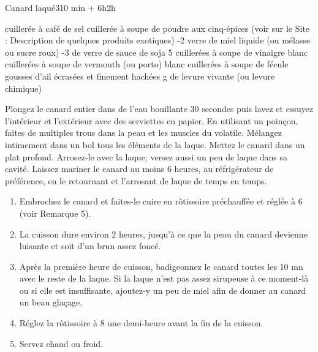 \begin{recette}{Canard laqué}{3}{10 min + 6h}{2h}

\begin{ingredients}
 cuillerée à café de sel
 cuillerée à soupe de poudre aux cinq-épices (voir sur le Site : Description de quelques produits exotiques)
-2 verre de miel liquide (ou mélasse ou sucre roux)
-3 de verre de sauce de soja 5 cuillerées à soupe de vinaigre blanc
 cuillerées à soupe de vermouth (ou porto) blanc
 cuillerées à soupe de fécule
 gousses d'ail écrasées et finement hachées
 g de levure vivante (ou levure chimique)
\end{ingredients}

\begin{preparation}
\etape Plongez le canard entier dans de l'eau bouillante 30 secondes puis lavez et essuyez l'intérieur et l'extérieur avec des serviettes en papier.
\etape En utilisant un poinçon, faites de multiples trous dans la peau et les muscles du volatile.
\etape Mélangez intimement dans un bol tous les éléments de la laque.
\etape Mettez le canard dans un plat profond. Arrosez-le avec la laque; versez aussi un peu de laque dans sa cavité.
\etape Laissez mariner le canard au moins 6 heures, au réfrigérateur de préférence, en le retournant et l'arrosant de laque de temps en temps.
\end{preparation}

\begin{cuisson}
\begin{enumerate}
\item Embrochez le canard et faites-le cuire en rôtissoire préchauffée et réglée à 6 (voir Remarque 5).
\item La cuisson dure environ 2 heures, jusqu'à ce que la peau du canard devienne luisante et soit d'un brun assez foncé.
\item Après la première heure de cuisson, badigeonnez le canard toutes les 10 mn avec le reste de la laque. Si la laque n'est pas assez sirupeuse à ce moment-là ou si elle est insuffisante, ajoutez-y un peu de miel afin de donner au canard un beau glaçage.
\item Réglez la rôtissoire à 8 une demi-heure avant la fin de la cuisson.
\item Servez chaud ou froid.
\end{enumerate}
\end{cuisson}
\end{recette}

